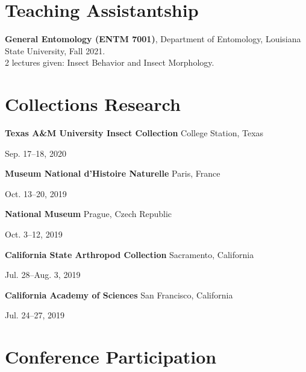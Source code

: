 \documentclass{article}
\newcommand{\hindent}{\hangindent=10pt}
\begin{document}

\section{Teaching Assistantship}
\newcommand{\TA}[5]{
    \noindent
    \hindent
    \textbf{#1}, %
    {#2}, %
    {#3}, %
    {#4}.\\ %
    \small{#5}. %
    \normalsize\par
}

\TA{General Entomology (ENTM 7001)}
{Department of Entomology}
{Louisiana State University}
{Fall 2021}
{2 lectures given: Insect Behavior and Insect Morphology}

\section{Collections Research}
\newcommand{\cresearch}[3]{
    \noindent
    \begin{minipage}[t]{.73\textwidth}
    \textbf{#1}
    \small{#2}
    \end{minipage}
    \begin{minipage}[t]{.25\textwidth}
    \hfill{#3}
    \end{minipage}
    \normalsize \par
}

\cresearch{Texas A\&M University Insect Collection}{College Station, Texas}
{Sep. 17--18, 2020}

\cresearch{Museum National d’Histoire Naturelle} 
{Paris, France}
{Oct. 13--20, 2019}

\cresearch{National Museum}{Prague, Czech Republic}{Oct. 3--12, 2019}

\cresearch{California State Arthropod Collection}{Sacramento, California}{Jul. 28--Aug. 3, 2019}

\cresearch{California Academy of Sciences}{San Francisco, California}{Jul. 24--27, 2019}

\section{Conference Participation}
\newcommand{\conference}[3]{
    \noindent
    \hindent
    \small
    \textbf{#1}, %
    {#3}, %
    {#2}. %
    \normalsize \par
}
\end{document}
